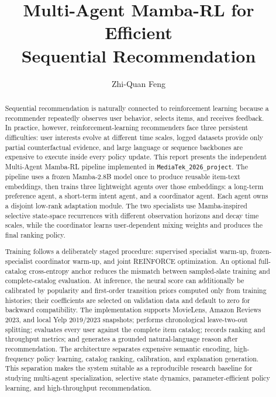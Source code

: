 \documentclass[11pt,a4paper]{article}
\title{\textbf{Multi-Agent Mamba-RL for Efficient\\Sequential Recommendation}}
\author{Zhi-Quan Feng}
\date{}
\newcommand{\Project}{\texttt{MediaTek\_2026\_project}}
\begin{document}
\maketitle

\begin{abstract}
Sequential recommendation is naturally connected to reinforcement learning because a recommender repeatedly observes user behavior, selects items, and receives feedback. In practice, however, reinforcement-learning recommenders face three persistent difficulties: user interests evolve at different time scales, logged datasets provide only partial counterfactual evidence, and large language or sequence backbones are expensive to execute inside every policy update. This report presents the independent Multi-Agent Mamba-RL pipeline implemented in \Project. The pipeline uses a frozen Mamba-2.8B model once to produce reusable item-text embeddings, then trains three lightweight agents over those embeddings: a long-term preference agent, a short-term intent agent, and a coordinator agent. Each agent owns a disjoint low-rank adaptation module. The two specialists use Mamba-inspired selective state-space recurrences with different observation horizons and decay time scales, while the coordinator learns user-dependent mixing weights and produces the final ranking policy.

Training follows a deliberately staged procedure: supervised specialist warm-up, frozen-specialist coordinator warm-up, and joint REINFORCE optimization. An optional full-catalog cross-entropy anchor reduces the mismatch between sampled-slate training and complete-catalog evaluation. At inference, the neural score can additionally be calibrated by popularity and first-order transition priors computed only from training histories; their coefficients are selected on validation data and default to zero for backward compatibility. The implementation supports MovieLens, Amazon Reviews 2023, and local Yelp 2019/2023 snapshots; performs chronological leave-two-out splitting; evaluates every user against the complete item catalog; records ranking and throughput metrics; and generates a grounded natural-language reason after recommendation. The architecture separates expensive semantic encoding, high-frequency policy learning, catalog ranking, calibration, and explanation generation. This separation makes the system suitable as a reproducible research baseline for studying multi-agent specialization, selective state dynamics, parameter-efficient policy learning, and high-throughput recommendation.
\end{abstract}
\end{document}
